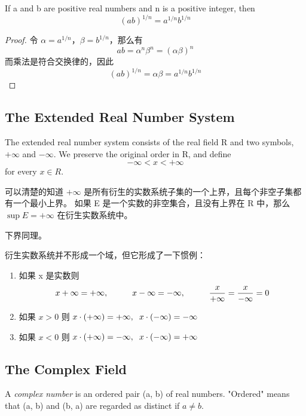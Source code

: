 \documentclass[../poma-note.tex]{subfiles}
\begin{document}
\begin{corollary}
	If a and b are positive real numbers and n is a positive integer, then
	\[(ab)^{1/n} = a^{1/n}b^{1/n}\]
\end{corollary}

\begin{proof}
	令 $\alpha = a^{1/n}$，$\beta = b^{1/n}$，那么有
	\[ab = \alpha^n \beta^n = (\alpha\beta)^n\]
	而乘法是符合交换律的，因此
	\[(ab)^{1/n} = \alpha\beta = a^{1/n}b^{1/n}\]
\end{proof}

\subsection*{The Extended Real Number System}

\setcounter{definition}{22}
\begin{definition}
	The extended real number system consists of the real field R and two symbols, $+\infty$ and $-\infty$.
	We preserve the original order in R, and define
	\[-\infty < x < +\infty\]
	for every $x \in R$.
\end{definition}

可以清楚的知道 $+\infty$ 是所有衍生的实数系统子集的一个上界，且每个非空子集都有一个最小上界。
如果 E 是一个实数的非空集合，且没有上界在 R 中，那么 $\sup E = + \infty$ 在衍生实数系统中。

下界同理。

衍生实数系统并不形成一个域，但它形成了一下惯例：

\begin{enumerate}[label=(\alph*)]
	\item 如果 x 是实数则
	      \[x+\infty=+\infty,\atab x-\infty=-\infty,\atab \frac{x}{+\infty}=\frac{x}{-\infty}=0\]
	\item 如果 $x>0$ 则 $x \cdot (+\infty) = +\infty,\atab[2mm] x \cdot (-\infty) = -\infty$
	\item 如果 $x<0$ 则 $x \cdot (+\infty) = -\infty,\atab[2mm] x \cdot (-\infty) = +\infty$
\end{enumerate}

\subsection*{The Complex Field}

\begin{definition}
	A \textit{complex number} is an ordered pair (a, b) of real numbers. "Ordered" means that (a, b) and (b, a)
	are regarded as distinct if $a \neq b$.
\end{definition}
\end{document}

